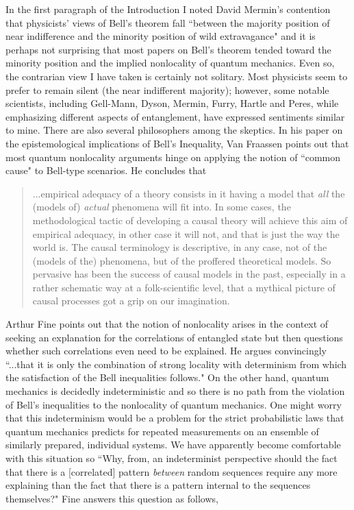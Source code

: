 \documentclass[12pt]{article}
\begin{document}
In the first paragraph of the Introduction I noted David Mermin's contention that physicists' views of Bell's theorem fall ``between the majority position of near indifference and the minority position of wild extravagance"\cite{Mer85} and it is perhaps not surprising that most papers on Bell's theorem tended toward the minority position and the implied nonlocality of quantum mechanics.  Even so, the contrarian view I have taken is certainly not solitary.  Most physicists seem to prefer to remain silent (the near indifferent majority); however,  some notable scientists, including Gell-Mann, Dyson, Mermin, Furry, Hartle and Peres, while emphasizing different aspects of entanglement, have expressed sentiments similar to mine.  There are also several philosophers among the skeptics.  In his paper on the epistemological implications of Bell's Inequality\cite{Van82}, Van Fraassen points out that most quantum nonlocality arguments hinge on applying the notion of ``common cause" to Bell-type scenarios.  He concludes that
\begin{quote}
...empirical adequacy of a theory consists in it having a model that {\it all} the (models of) {\it actual} phenomena will fit into.  In some cases, the methodological tactic of developing a causal theory will achieve this aim of empirical adequacy, in other case it will not, and that is just the way the world is.  The causal terminology is descriptive, in any case, not of the (models of the) phenomena, but of the proffered theoretical models.  So pervasive has been the success of causal models in the past, especially in a rather schematic way at a folk-scientific level, that a mythical picture of causal processes got a grip on our imagination.
\end{quote}
Arthur Fine\cite{Fin89} points out that the notion of nonlocality arises in the context of seeking an explanation for the correlations of entangled state but then questions whether such correlations even need to be explained.  He argues convincingly ``...that it is only the combination of strong locality with determinism from which the satisfaction of the Bell inequalities follows."  On the other hand, quantum mechanics is decidedly indeterministic and so there is no path from the violation of Bell's inequalities to the nonlocality of quantum mechanics.  One might worry that this indeterminism would be a problem for the strict probabilistic laws that quantum mechanics predicts for repeated measurements on an ensemble of similarly prepared, individual systems.  We have apparently become comfortable with this situation so ``Why, from, an indeterminist perspective should the fact that there is a [correlated] pattern {\it between} random sequences require any more explaining than the fact that there is a pattern internal to the sequences themselves?"  Fine answers this question as follows,
\end{document}

